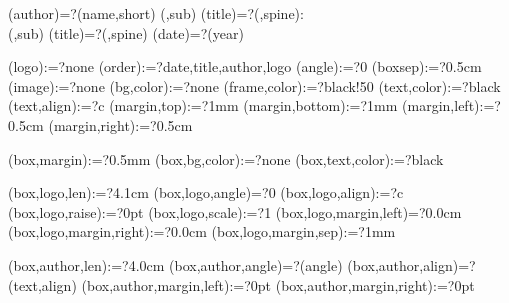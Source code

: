 
%


\makeatletter




\spine(author)=?{\thedocauthor(name,short)}
(\@LANG@COVER,sub){%
  \spine(title)=?{\thedoctitle(\@LANG@COVER,spine):\\\thedoctitle(\@LANG@COVER,sub)}
}{%
  \spine(title)=?{\thedoctitle(\@LANG@COVER,spine)}
}
\spine(date)=?{\thentdocdate(year)}


\spine(logo):=?{none}
\spine(order):=?{date,title,author,logo}
\spine(angle):=?{0}
\spine(boxsep):=?{0.5cm}
\spine(image):=?{none}
\spine(bg,color):=?{none}
\spine(frame,color):=?{black!50}
\spine(text,color):=?{black}
\spine(text,align):=?{c}
\spine(margin,top):=?{1mm}
\spine(margin,bottom):=?{1mm}
\spine(margin,left):=?{0.5cm}
\spine(margin,right):=?{0.5cm}

\spine(box,margin):=?{0.5mm}
\spine(box,bg,color):=?{none}
\spine(box,text,color):=?{black}

\spine(box,logo,len):=?{4.1cm}
\spine(box,logo,angle)=?{0}
\spine(box,logo,align):=?{c}
\spine(box,logo,raise):=?{0pt}
\spine(box,logo,scale):=?{1}
\spine(box,logo,margin,left)=?{0.0cm}
\spine(box,logo,margin,right):=?{0.0cm}
\spine(box,logo,margin,sep):=?{1mm}

\spine(box,author,len):=?{4.0cm}
\spine(box,author,angle)=?{\thespine(angle)}
\spine(box,author,align)=?{\thespine(text,align)}
\spine(box,author,margin,left):=?{0pt}
\spine(box,author,margin,right):=?{0pt}

